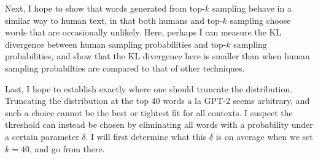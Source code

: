 \documentclass[11pt]{extarticle}
\begin{document}
Next, I hope to show that words generated from top-$k$ sampling behave in a similar way to human text, in that both humans and top-$k$ sampling choose words that are occasionally unlikely. Here, perhaps I can measure the KL divergence between human sampling probabilities and top-$k$ sampling probabilities, and show that the KL divergence here is smaller than when human sampling probabilties are compared to that of other techniques.

Last, I hope to establish exactly where one should truncate the distribution. Truncating the distribution at the top 40 words a la GPT-2 seems arbitrary, and such a choice cannot be the best or tightest fit for all contexts. I suspect the threshold can instead be chosen by eliminating all words with a probability under a certain parameter $\delta$. I will first determine what this $\delta$ is on average when we set $k = 40$, and go from there.



\end{document}
